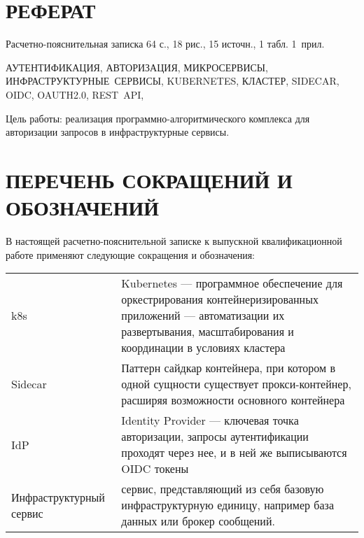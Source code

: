 {\centering \chapter*{РЕФЕРАТ}}

Расчетно-пояснительная записка 64 с., 18 рис., 15 источн., 1 табл. \mbox{1 прил.}

\noindent \mbox{АУТЕНТИФИКАЦИЯ}, \mbox{АВТОРИЗАЦИЯ}, \mbox{МИКРОСЕРВИСЫ}, \mbox{ИНФРАСТРУКТУРНЫЕ СЕРВИСЫ}, \mbox{KUBERNETES}, \mbox{КЛАСТЕР},  \mbox{SIDECAR}, \mbox{OIDC}, \mbox{OAUTH2.0}, \mbox{REST API},

Цель работы: реализация программно-алгоритмического комплекса для авторизации запросов в инфраструктурные сервисы.

{\centering \maketableofcontents}

{\centering \chapter*{ПЕРЕЧЕНЬ СОКРАЩЕНИЙ И ОБОЗНАЧЕНИЙ}}

В настоящей расчетно-пояснительной записке к выпускной квалификационной работе применяют следующие сокращения и обозначения:

\begin{table}[H]
\begin{tabular}{p{5cm}p{10.5cm}}
k8s & Kubernetes --- программное обеспечение для оркестрирования контейнеризированных приложений --- автоматизации их развертывания, масштабирования и координации в условиях кластера
\tabularnewline
Sidecar & Паттерн сайдкар контейнера, при котором в одной сущности существует прокси-контейнер, расширяя возможности основного контейнера
\tabularnewline
IdP & Identity Provider --- ключевая точка авторизации, запросы аутентификации проходят через нее, и в ней же выписываются OIDC токены
\tabularnewline
Инфраструктурный сервис & сервис, представляющий из себя базовую инфраструктурную единицу, например база данных или брокер сообщений.
\tabularnewline
\end{tabular}
\end{table}
